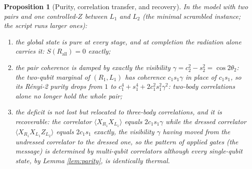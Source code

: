 \documentclass[11pt]{article}
\newtheorem{proposition}[theorem]{Proposition}
\theoremstyle{definition}
\begin{document}
\begin{proposition}[Purity, correlation transfer, and recovery]\label{prop:transfer}
In the model with two pairs and one controlled-$Z$ between $L_1$ and $L_2$ (the minimal scrambled instance; the script runs larger ones):
\begin{enumerate}
\item the global state is pure at every stage, and at completion the radiation alone carries it: $S(R_{\mathrm{all}}) = 0$ exactly;
\item the pair coherence is damped by exactly the visibility $\gamma = c_2^2 - s_2^2 = \cos 2\theta_2$: the two-qubit marginal of $(R_1, L_1)$ has coherence $c_1 s_1 \gamma$ in place of $c_1 s_1$, so its R\'enyi-2 purity drops from $1$ to $c_1^4 + s_1^4 + 2 c_1^2 s_1^2 \gamma^2$: two-body correlations alone no longer hold the whole pair;
\item the deficit is not lost but relocated to three-body correlations, and it is recoverable: the correlator $\langle X_{R_1} X_{L_1} \rangle$ equals $2 c_1 s_1 \gamma$ while the dressed correlator $\langle X_{R_1} X_{L_1} Z_{L_2} \rangle$ equals $2 c_1 s_1$ exactly, the visibility $\gamma$ having moved from the undressed correlator to the dressed one, so the pattern of applied gates (the message) is determined by multi-qubit correlators although every single-qubit state, by Lemma \ref{lem:parity}, is identically thermal.
\end{enumerate}
\end{proposition}
\end{document}
